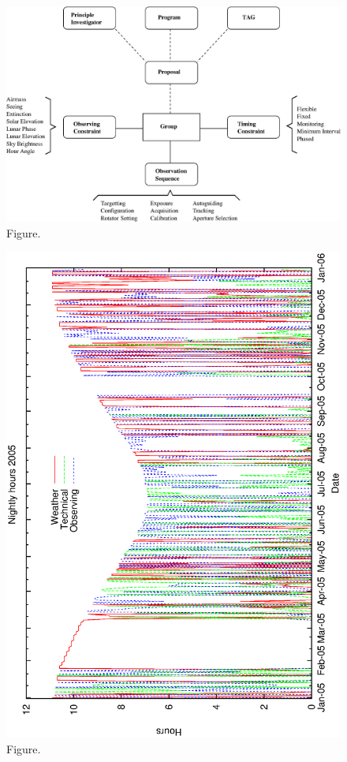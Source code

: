 \documentclass[12pt,a4paper]{article}
\begin{document}
\clearpage
\begin{figure}[htbp]
 \begin{center}
  \includegraphics[scale=1.0, angle=0]{figures/group_structure.eps}
 \end{center}
  \caption[Figure.]
{Figure.}
\end{figure}
\clearpage
\begin{figure}[htbp]
 \begin{center}
  \includegraphics[scale=1.0, angle=0]{figures/met_nightly_stats_g2005.eps}
 \end{center}
  \caption[Figure.]
{Figure.}
\end{figure}
\end{document}
